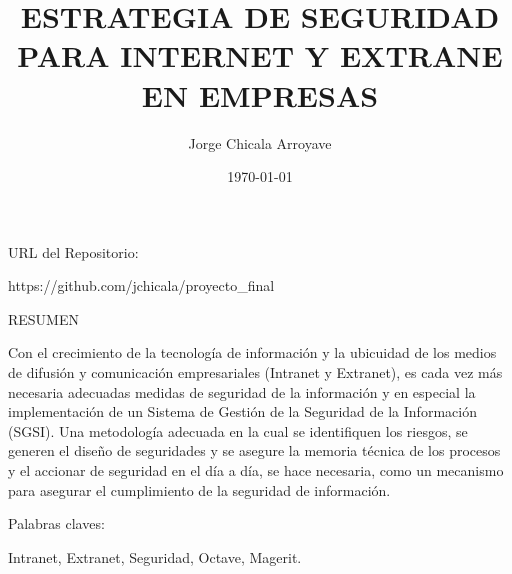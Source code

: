 \documentclass[a4paper,11pt]{article}
\begin{document}
\title{ESTRATEGIA DE SEGURIDAD PARA INTERNET Y EXTRANE EN EMPRESAS}
\author{Jorge Chicala Arroyave}
\date{\today}
\maketitle
\begin{bf}
URL del Repositorio: 
\end{bf}
https://github.com/jchicala/proyecto_final \\
\begin{bf}
\begin{center}
RESUMEN \\
\end{center}
\end{bf}
Con el crecimiento de la tecnología de información y la ubicuidad de los medios
de difusión y comunicación empresariales (Intranet y Extranet), es cada vez más
necesaria adecuadas medidas de seguridad de la información y en especial la 
implementación de un Sistema de Gestión de la Seguridad de la Información (SGSI).
 Una metodología adecuada en la cual se identifiquen los riesgos, se generen el 
diseño de seguridades y se asegure la memoria técnica de los procesos y el 
accionar de seguridad en el día a día, se hace necesaria, como un mecanismo para asegurar el cumplimiento de la seguridad de información.\newline   
\begin{bf}
Palabras claves:
\end{bf}
Intranet, Extranet, Seguridad, Octave, Magerit. \\
\begin{minipage}[t]{0.5\textwidth}
\end{minipage}
\cite{Monte2015}
\cite{OccupyTheWeb2019}


\end{document}
